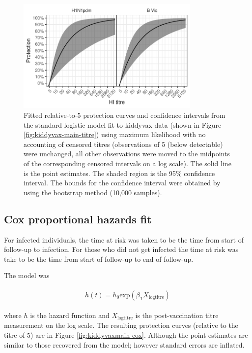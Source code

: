 \documentclass[12pt]{article}
\begin{document}
\begin{figure}[htp]
	\centering
	\includegraphics[width=0.8\textwidth]{../fit-logistic-boot-plot/kiddyvaxmain-prot-rel.pdf}
	\caption{
	Fitted relative-to-5 protection curves and confidence intervals from the standard logistic model fit to kiddyvax data (shown in Figure \ref{fig:kiddyvax-main-titre}) using maximum likelihood with no accounting of censored titres (observations of 5 (below detectable) were unchanged, all other observations were moved to the midpoints of the corresponding censored intervals on a log scale). The solid line is the point estimates. The shaded region is the 95\% confidence interval. The bounds for the confidence interval were obtained by using the bootstrap method (10,000 samples).
	}
	\label{fig:kiddyvaxmain-prot-rel-lr-boot}
\end{figure}

\subsection{Cox proportional hazards fit}

For infected individuals, the time at risk was taken to be the time from start of follow-up to infection. For those who did not get infected the time at risk was take to be the time from start of follow-up to end of follow-up.

The model was

\begin{align*}
\begin{gathered}
h(t) = h_0\text{exp}(\beta_T X_{\text{logtitre}})
\end{gathered}
\end{align*}

where $h$ is the hazard function and $X_{\text{logtitre}}$ is the post-vaccination titre measurement on the log scale. The resulting protection curves (relative to the titre of 5) are in Figure \ref{fig:kiddyvaxmain-cox}. Although the point estimates are similar to those recovered from the model; however standard errors are inflated.
\end{document}
